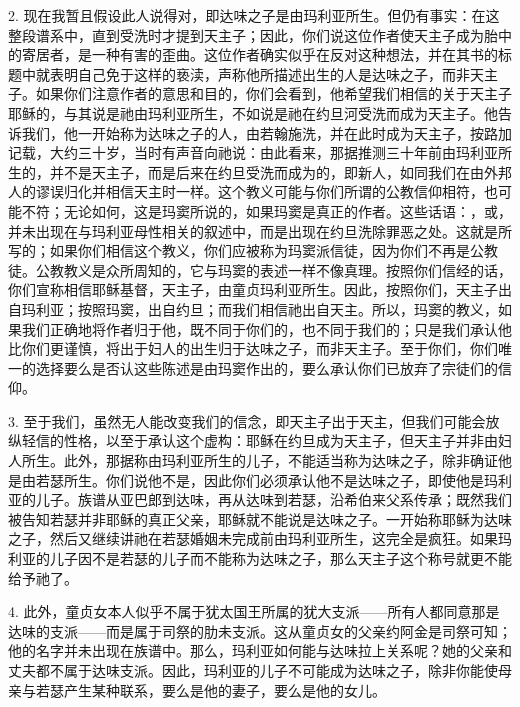 2. 现在我暂且假设此人说得对，即达味之子是由玛利亚所生。但仍有事实：在这整段谱系中，直到受洗时才提到天主子；因此，你们说这位作者使天主子成为胎中的寄居者，是一种有害的歪曲。这位作者确实似乎在反对这种想法，并在其书的标题中就表明自己免于这样的亵渎，声称他所描述出生的人是达味之子，而非天主子。如果你们注意作者的意思和目的，你们会看到，他希望我们相信的关于天主子耶稣的，与其说是祂由玛利亚所生，不如说是祂在约旦河受洗而成为天主子。他告诉我们，他一开始称为达味之子的人，由若翰施洗，并在此时成为天主子，按路加记载，大约三十岁，当时有声音向祂说：由此看来，那据推测三十年前由玛利亚所生的，并不是天主子，而是后来在约旦受洗而成为的，即新人，如同我们在由外邦人的谬误归化并相信天主时一样。这个教义可能与你们所谓的公教信仰相符，也可能不符；无论如何，这是玛窦所说的，如果玛窦是真正的作者。这些话语：，或，并未出现在与玛利亚母性相关的叙述中，而是出现在约旦洗除罪恶之处。这就是所写的；如果你们相信这个教义，你们应被称为玛窦派信徒，因为你们不再是公教徒。公教教义是众所周知的，它与玛窦的表述一样不像真理。按照你们信经的话，你们宣称相信耶稣基督，天主子，由童贞玛利亚所生。因此，按照你们，天主子出自玛利亚；按照玛窦，出自约旦；而我们相信祂出自天主。所以，玛窦的教义，如果我们正确地将作者归于他，既不同于你们的，也不同于我们的；只是我们承认他比你们更谨慎，将出于妇人的出生归于达味之子，而非天主子。至于你们，你们唯一的选择要么是否认这些陈述是由玛窦作出的，要么承认你们已放弃了宗徒们的信仰。\par

3. 至于我们，虽然无人能改变我们的信念，即天主子出于天主，但我们可能会放纵轻信的性格，以至于承认这个虚构：耶稣在约旦成为天主子，但天主子并非由妇人所生。此外，那据称由玛利亚所生的儿子，不能适当称为达味之子，除非确证他是由若瑟所生。你们说他不是，因此你们必须承认他不是达味之子，即使他是玛利亚的儿子。族谱从亚巴郎到达味，再从达味到若瑟，沿希伯来父系传承；既然我们被告知若瑟并非耶稣的真正父亲，耶稣就不能说是达味之子。一开始称耶稣为达味之子，然后又继续讲祂在若瑟婚姻未完成前由玛利亚所生，这完全是疯狂。如果玛利亚的儿子因不是若瑟的儿子而不能称为达味之子，那么天主子这个称号就更不能给予祂了。\par

4. 此外，童贞女本人似乎不属于犹太国王所属的犹大支派——所有人都同意那是达味的支派——而是属于司祭的肋未支派。这从童贞女的父亲约阿金是司祭可知；他的名字并未出现在族谱中。那么，玛利亚如何能与达味拉上关系呢？她的父亲和丈夫都不属于达味支派。因此，玛利亚的儿子不可能成为达味之子，除非你能使母亲与若瑟产生某种联系，要么是他的妻子，要么是他的女儿。\par

